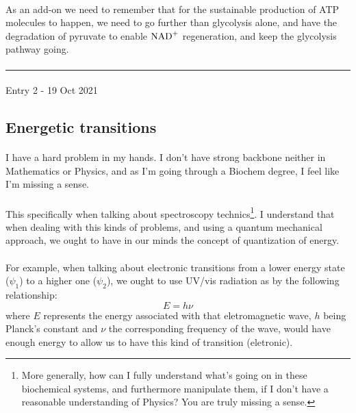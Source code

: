 \documentclass[12pt,  letterpaper]{article}
\begin{document}
\paragraph*{}
As an add-on we need to remember that for the sustainable production of ATP molecules to happen, we need to go further than glycolysis alone, and have the degradation of pyruvate to enable $\ce{NAD+}$ regeneration, and keep the glycolysis pathway going.
\paragraph*{}
\hrule 
\paragraph*{}
Entry 2 - 19 Oct 2021
\subsection*{Energetic transitions}
\paragraph*{}
I have a hard problem in my hands. I don't have strong backbone neither in Mathematics or Physics, and as I'm going through a Biochem degree, I feel like I'm missing a sense.
\paragraph*{}
This specifically when talking about spectroscopy technics\footnote{More generally, how can I fully understand what's going on in these biochemical systems, and furthermore manipulate them, if I don't have a reasonable understanding of Physics? You are truly missing a sense.}. I understand that when dealing with this kinds of problems, and using a quantum mechanical approach, we ought to have in our minds the concept of quantization of energy.
\paragraph*{}
For example, when talking about electronic transitions from a lower energy state ($\psi_{1}$) to a higher one ($\psi_{2}$), we ought to use UV/vis radiation as by the following relationship:
\begin{equation}
E = h \nu 
\end{equation}
where $E$ represents the energy associated with that eletromagnetic wave, $h$ being Planck's constant and $\nu$ the corresponding frequency of the wave, would have enough energy to allow us to have this kind of transition (eletronic).
\end{document}
